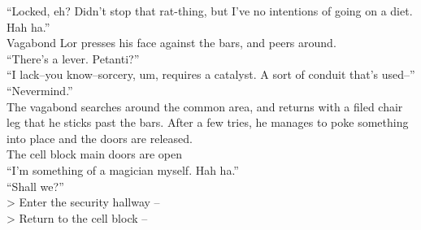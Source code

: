 “Locked, eh? Didn’t stop that rat-thing, but I’ve no intentions of going on a diet. Hah ha.”\\

Vagabond Lor presses his face against the bars, and peers around.\\
“There’s a lever. Petanti?”\\

“I lack--you know--sorcery, um, requires a catalyst. A sort of conduit that’s used--”\\

“Nevermind.”\\
The vagabond searches around the common area, and returns with a filed chair leg that he sticks past the bars. After a few tries, he manages to poke something into place and the doors are released.\\
 The cell block main doors are open\\

“I’m something of a magician myself. Hah ha.”\\

“Shall we?”\\

> Enter the security hallway -- \\
> Return to the cell block -- 